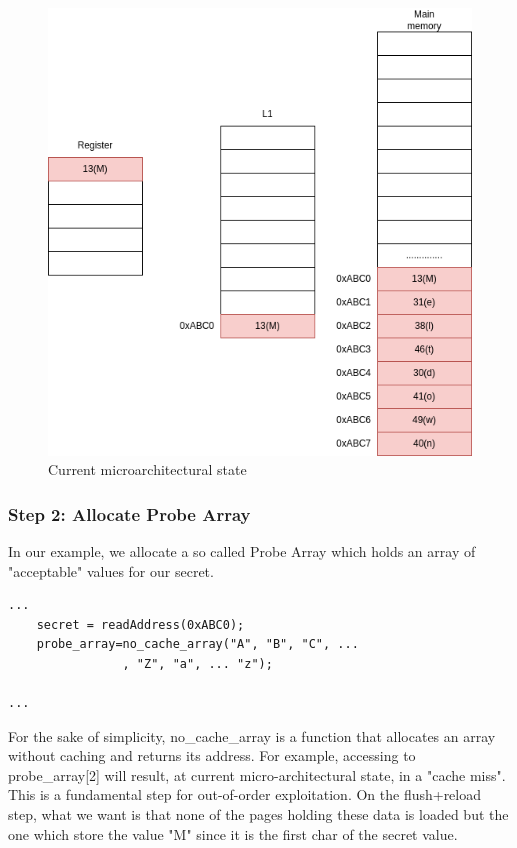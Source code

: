 \begin{figure}[!h]
    \includegraphics[scale=0.25]{img/meltdown-step-one.png}
    \caption{Current microarchitectural state}
\end{figure}


\subsubsection{Step 2: Allocate Probe Array}
In our example, we allocate a so called Probe Array which holds an array of "acceptable" values for our secret.
\begin{verbatim}
...
    secret = readAddress(0xABC0);
    probe_array=no_cache_array("A", "B", "C", ... 
                , "Z", "a", ... "z");

...
\end{verbatim}
For the sake of simplicity, no\_cache\_array is a function that allocates an array without caching and returns its address.
For example, accessing to probe\_array[2] will result, at current micro-architectural state, in a "cache miss".
This is a fundamental step for out-of-order exploitation.
On the flush+reload step, what we want is that none of the pages holding these data is loaded but the one which store the value
"M" since it is the first char of the secret value.

